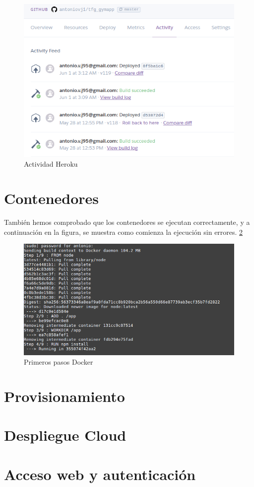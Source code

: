 \begin{figure}
  \begin{center}
    \includegraphics[width=\textwidth]{imagenes/heroku.png}
    \caption{Actividad Heroku}
    \label{fig:heroku}
  \end{center}
\end{figure}

\section {Contenedores}
También hemos comprobado que los contenedores se ejecutan correctamente, y a continuación en la figura, se muestra como comienza la ejecución sin errores. \ref{fig:docker}
\begin{figure}
  \begin{center}
    \includegraphics[width=\textwidth]{imagenes/docker.png}
    \caption{Primeros pasos Docker}
    \label{fig:docker}
  \end{center}
\end{figure}

\section {Provisionamiento}
\section {Despliegue Cloud}
\section {Acceso web y autenticación}
